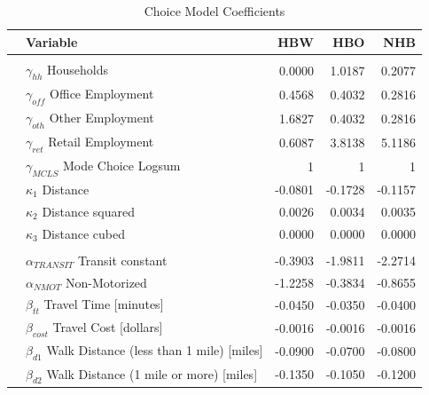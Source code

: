 \begin{table}

\caption{\label{tab:coeffs}Choice Model Coefficients}
\centering
\begin{tabular}[t]{llrrr}
\toprule
 & Variable & HBW & HBO & NHB\\
\midrule
\addlinespace[0.3em]
\multicolumn{5}{l}{\textbf{Destination Choice}}\\
\hspace{1em} & $\gamma_{hh}$ Households & 0.0000 & 1.0187 & 0.2077\\
\hspace{1em} & $\gamma_{off}$ Office Employment & 0.4568 & 0.4032 & 0.2816\\
\hspace{1em} & $\gamma_{oth}$ Other Employment & 1.6827 & 0.4032 & 0.2816\\
\hspace{1em} & $\gamma_{ret}$ Retail Employment & 0.6087 & 3.8138 & 5.1186\\
\hspace{1em} & $\gamma_{MCLS}$ Mode Choice Logsum & 1 & 1 & 1\\
\hspace{1em} & $\kappa_1$ Distance & -0.0801 & -0.1728 & -0.1157\\
\hspace{1em} & $\kappa_2$ Distance squared & 0.0026 & 0.0034 & 0.0035\\
\hspace{1em} & $\kappa_3$ Distance cubed & 0.0000 & 0.0000 & 0.0000\\
\cmidrule{1-5}
\addlinespace[0.3em]
\multicolumn{5}{l}{\textbf{Mode Choice}}\\

\hspace{1em} & $\alpha_{TRANSIT}$ Transit constant & -0.3903 & -1.9811 & -2.2714\\
\hspace{1em} & $\alpha_{NMOT}$ Non-Motorized & -1.2258 & -0.3834 & -0.8655\\
\hspace{1em} & $\beta_{tt}$ Travel Time [minutes] & -0.0450 & -0.0350 & -0.0400\\
\hspace{1em} & $\beta_{cost}$ Travel Cost [dollars] & -0.0016 & -0.0016 & -0.0016\\
\hspace{1em} & $\beta_{d1}$ Walk Distance (less than 1 mile) [miles] & -0.0900 & -0.0700 & -0.0800\\
\hspace{1em} & $\beta_{d2}$ Walk Distance (1 mile or more) [miles] & -0.1350 & -0.1050 & -0.1200\\
\bottomrule
\end{tabular}
\end{table}

